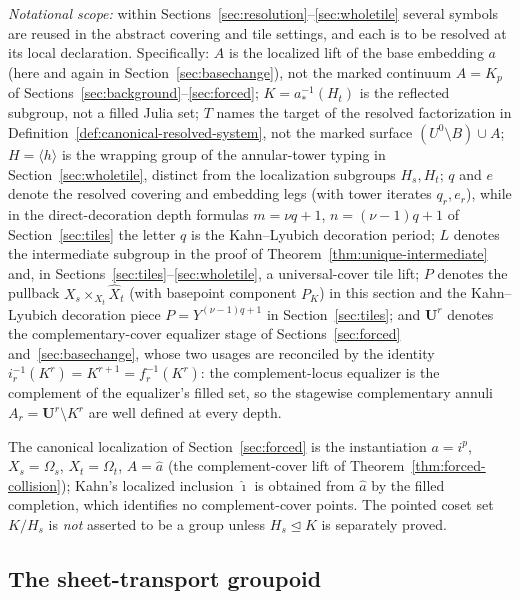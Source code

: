 \documentclass[11pt,reqno]{amsart}
\theoremstyle{definition}
\theoremstyle{remark}
\begin{document}
\emph{Notational scope:} within
Sections~\ref{sec:resolution}--\ref{sec:wholetile} several symbols are
reused in the abstract covering and tile settings, and each is to be
resolved at its local declaration.  Specifically: $A$ is the localized
lift of the base embedding $a$ (here and again in
Section~\ref{sec:basechange}), not the marked continuum $A=K_{p}$ of
Sections~\ref{sec:background}--\ref{sec:forced}; $K=a_{*}^{-1}(H_{t})$
is the reflected subgroup, not a filled Julia set; $T$ names the target
of the resolved factorization in
Definition~\ref{def:canonical-resolved-system}, not the marked surface
$(U^{0}\setminus B)\cup A$; $H=\langle h\rangle$ is the wrapping group
of the annular-tower typing in Section~\ref{sec:wholetile}, distinct
from the localization subgroups $H_{s},H_{t}$; $q$ and $e$ denote the
resolved covering and embedding legs (with tower iterates
$q_{r},e_{r}$), while in the direct-decoration depth formulas
$m=\nu q+1$, $n=(\nu-1)q+1$ of Section~\ref{sec:tiles} the letter $q$
is the Kahn--Lyubich decoration period; $L$ denotes the intermediate
subgroup in the proof of Theorem~\ref{thm:unique-intermediate} and, in
Sections~\ref{sec:tiles}--\ref{sec:wholetile}, a universal-cover tile
lift; $P$ denotes the pullback $X_{s}\times_{X_{t}}\widehat X_{t}$
(with basepoint component $P_{K}$) in this section and the
Kahn--Lyubich decoration piece $P=Y^{(\nu-1)q+1}$ in
Section~\ref{sec:tiles}; and $\mathbf U^{r}$ denotes the
complementary-cover equalizer stage of Sections~\ref{sec:forced}
and~\ref{sec:basechange}, whose two usages are reconciled by the
identity $i_{r}^{-1}(K^{r})=K^{r+1}=f_{r}^{-1}(K^{r})$: the
complement-locus equalizer is the complement of the equalizer's filled
set, so the stagewise complementary annuli
$A_{r}=\mathbf U^{r}\setminus K^{r}$ are well defined at every depth.

The canonical
localization of Section~\ref{sec:forced} is the instantiation
$a=i^{p}$, $X_{s}=\Omega_{s}$, $X_{t}=\Omega_{t}$, $A=\widehat a$ (the
complement-cover lift of Theorem~\ref{thm:forced-collision}); Kahn's
localized inclusion $\widehat\imath$ is obtained from $\widehat a$ by
the filled completion, which identifies no complement-cover points.
The pointed
coset set $K/H_{s}$ is \emph{not} asserted to be a group unless
$H_{s}\trianglelefteq K$ is separately proved.


\subsection{The sheet-transport groupoid}
\end{document}
